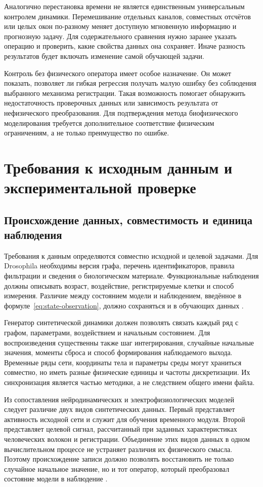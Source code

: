 Аналогично перестановка времени не является единственным универсальным контролем динамики. Перемешивание отдельных каналов, совместных отсчётов или целых окон по-разному меняет доступную мгновенную информацию и прогнозную задачу. Для содержательного сравнения нужно заранее указать операцию и проверить, какие свойства данных она сохраняет. Иначе разность результатов будет включать изменение самой обучающей задачи.

Контроль без физического оператора имеет особое назначение. Он может показать, позволяет ли гибкая регрессия получать малую ошибку без соблюдения выбранного механизма регистрации. Такая возможность помогает обнаружить недостаточность проверочных данных или зависимость результата от нефизического преобразования. Для подтверждения метода биофизического моделирования требуется дополнительное соответствие физическим ограничениям, а не только преимущество по ошибке.

\section{Требования к исходным данным и экспериментальной проверке}
\label{sec:data-validation}

\subsection{Происхождение данных, совместимость и единица наблюдения}

Требования к данным определяются совместно исходной и целевой задачами. Для Drosophila необходимы версия графа, перечень идентификаторов, правила фильтрации и сведения о биологическом материале. Функциональные наблюдения должны описывать возраст, воздействие, регистрируемые клетки и способ измерения. Различие между состоянием модели и наблюдением, введённое в формуле~\eqref{eq:state-observation}, должно сохраняться и в обучающих данных \cite{s904,s212}.

Генератор синтетической динамики должен позволять связать каждый ряд с графом, параметрами, воздействием и начальным состоянием. Для воспроизведения существенны также шаг интегрирования, случайные начальные значения, моменты сброса и способ формирования наблюдаемого выхода. Временные ряды сети, координаты тела и параметры среды могут храниться совместно, но иметь разные физические единицы и частоты дискретизации. Их синхронизация является частью методики, а не следствием общего имени файла.

Из сопоставления нейродинамических и электрофизиологических моделей следует различие двух видов синтетических данных. Первый представляет активность исходной сети и служит для обучения временного модуля. Второй представляет целевой сигнал, рассчитанный при заданных характеристиках человеческих волокон и регистрации. Объединение этих видов данных в одном вычислительном процессе не устраняет различия их физического смысла. Поэтому происхождение записи должно позволять восстановить не только случайное начальное значение, но и тот оператор, который преобразовал состояние модели в наблюдение \cite{s285,ecapmodel,s746}.

